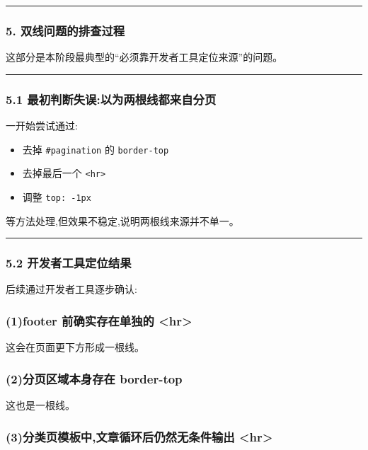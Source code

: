 \documentclass[lang=cn,scheme=chinese,color=blue,device=normal,toc=onecol,math=cm]{elegantbook}
\begin{document}
\medskip\hrule\medskip


\subsubsection{5. 双线问题的排查过程}


这部分是本阶段最典型的“必须靠开发者工具定位来源”的问题。\par


\medskip\hrule\medskip


\subsubsection{5.1 最初判断失误:以为两根线都来自分页}


一开始尝试通过:\par


\begin{itemize}
\item 去掉 \texttt{\#pagination} 的 \texttt{border-top}
\item 去掉最后一个 \texttt{<hr>}
\item 调整 \texttt{top: -1px}
\end{itemize}


等方法处理,但效果不稳定,说明两根线来源并不单一。\par


\medskip\hrule\medskip


\subsubsection{5.2 开发者工具定位结果}


后续通过开发者工具逐步确认:\par


\subsubsection{(1)footer 前确实存在单独的 <hr>}


这会在页面更下方形成一根线。\par


\subsubsection{(2)分页区域本身存在 border-top}


这也是一根线。\par


\subsubsection{(3)分类页模板中,文章循环后仍然无条件输出 <hr>}
\end{document}
